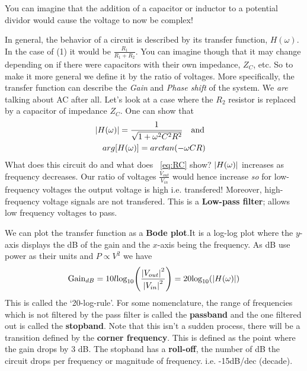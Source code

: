 You can imagine that the addition of a capacitor or inductor to a potential dividor would cause the voltage to now be complex!\par
In general, the behavior of a circuit is described by its transfer function, $H(\omega)$. In the case of (1) it would be $\frac{R_{1}}{R_{1} + R_{2}}$. You can imagine though that it may change depending on if there were capacitors with their own impedance, $Z_{C}$, etc. So to make it more general we define it by the ratio of voltages. More specifically, the transfer function can describe the \textit{Gain} and \textit{Phase shift} of the system. We \textit{are} talking about AC after all.  Let's look at a case where the $R_{2}$ resistor is replaced by a capacitor of impedance $Z_{C}$. One can show that 
\begin{equation} \label{eq:RC}
\begin{gathered}
\abs{H(\omega)} = \frac{1}{\sqrt{1+\omega^{2}C^{2}R^{2}}}\quad \textrm{and}\quad  \\ arg[H(\omega)] = arctan(-\omega CR)
\end{gathered}
\end{equation}
What does this circuit do and what does ~\ref{eq:RC} show? $\abs{H(\omega)}$ increases as frequency decreases. Our ratio of voltages $\frac{V_{out}}{V_{in}}$ would hence increase \textit{so} for low-frequency voltages the output voltage is high i.e. transfered! Moreover, high-frequency voltage signals are not transfered. This is a \textbf{Low-pass filter}; allows low frequency voltages to pass. \par We can plot the transfer function as a \textbf{Bode plot}.It is a log-log plot where the $y$-axis displays the dB of the gain and the $x$-axis being the frequency. As dB use power as their units and $ P \propto V^{2}$ we have
\begin{equation}
\begin{gathered}
\textrm{Gain}_{dB} = 10l\textrm{log}_{10}\Bigg(\frac{\abs{V_{out}}^{2}}{\abs{V_{in}}^{2}}\Bigg) = 20\textrm{log}_{10}(\abs{H(\omega)})
\end{gathered}
\end{equation}
This is called the `20-log-rule'. For some nomenclature, the range of frequencies which is not filtered by the pass filter is called the \textbf{passband} and the one filtered out is called the \textbf{stopband}. Note that this isn't a sudden process, there will be a transition defined by the \textbf{corner frequency}. This is defined as the point where the gain drops by 3 dB. The stopband has a \textbf{roll-off}, the number of dB the circuit drops per frequency or magnitude of frequency. i.e. -15dB/dec (decade).
